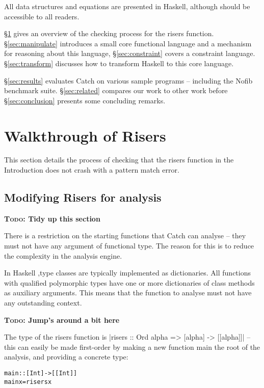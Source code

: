 \documentclass[preprint]{sigplanconf}
\newcommand{\C}[1]{\textsf{#1}}
\newcommand{\todo}[1]{\textbf{\textsc{Todo:} #1}}
\newenvironment{code}{\begin{alltt}\small}{\end{alltt}}
\begin{document}
All data structures and equations are presented in Haskell, although should be accessible to all readers.

\S\ref{sec:walkthrough} gives an overview of the checking process for the \C{risers} function. \S\ref{sec:manipulate} introduces a small core functional language and a mechanism for reasoning about this language, \S\ref{sec:constraint} covers a constraint language. \S\ref{sec:transform} discusses how to transform Haskell to this core language.

\S\ref{sec:results} evaluates Catch on various sample programs -- including the Nofib benchmark suite. \S\ref{sec:related} compares our work to other work before \S\ref{sec:conclusion} presents some concluding remarks.

\section{Walkthrough of Risers}
\label{sec:walkthrough}

This section details the process of checking that the \C{risers} function in the Introduction does not crash with a pattern match error.

\subsection{Modifying Risers for analysis}

\todo{Tidy up this section}

There is a restriction on the starting functions that Catch can analyse -- they must not have any argument of functional type. The reason for this is to reduce the complexity in the analysis engine.

In Haskell \citep{haskell},type classes are typically implemented \citep{type_classes} as dictionaries. All functions with qualified polymorphic types have one or more dictionaries of class methods as auxiliary arguments. This means that the function to analyse must not have any outstanding context.

\todo{Jump's around a bit here}

The type of the \C{risers} function is |risers :: Ord alpha => [alpha] -> [[alpha]]| -- this can easily be made first-order by making a new function \C{main} the root of the analysis, and providing a concrete type:

\begin{code}
main :: [Int] -> [[Int]]
main x = risers x
\end{code}
\end{document}
